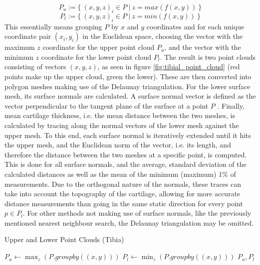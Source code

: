 \newline
\begin{equation}
	P_{u} := \{\:(x,y,z)_i \in P \:|\: z = max(f(x,y))\:\}
\end{equation}
\begin{equation}
	P_{l} := \{\:(x,y,z)_i \in P \:|\: z = min(f(x,y))\:\}
\end{equation}
\newline
This essentially means grouping $P$ by $x$ and $y$ coordinates and for each unique coordinate pair $(x_i, y_i)$ in the Euclidean space, choosing the vector with the maximum $z$ coordinate for the upper point cloud $P_{u}$, and the vector with the minimum $z$ coordinate for the lower point cloud $P_{l}$. The result is two point clouds consisting of vectors $(x, y, z)$, as seen in figure \ref{fig:tibial_point_cloud} (red points make up the upper cloud, green the lower). These are then converted into polygon meshes making use of the Delaunay triangulation. For the lower surface mesh, its surface normals are calculated. A surface normal vector is defined as the vector perpendicular to the tangent plane of the surface at a point $P$ \cite{enwiki:normal}. Finally, mean cartilage thickness, i.e. the mean distance between the two meshes, is calculated by tracing along the normal vectors of the lower mesh against the upper mesh. To this end, each surface normal is iteratively extended until it hits the upper mesh, and the Euclidean norm of the vector, i.e. its length, and therefore the distance between the two meshes at a specific point, is computed. This is done for all surface normals, and the average, standard deviation of the calculated distances as well as the mean of the minimum (maximum) 1\% of measurements. Due to the orthogonal nature of the normals, these traces can take into account the topography of the cartilage, allowing for more accurate distance measurements than going in the same static direction for every point $p \in P_{l}$. For other methods not making use of surface normals, like the previously mentioned nearest neighbour search, the Delaunay triangulation may be omitted.
\begin{algorithm}
	\caption{Upper and Lower Point Clouds (Tibia)}
	\label{algo:tibialpointclouds}
	\begin{algorithmic}[1]
		\State $P_{u} \gets \max_z (P.groupby((x,y)))$
		\State $P_{l} \gets \min_z (P.groupby((x,y)))$
		\State
		\Return $P_{u}, P_{l}$
		\EndProcedure
	\end{algorithmic}
\end{algorithm} 
